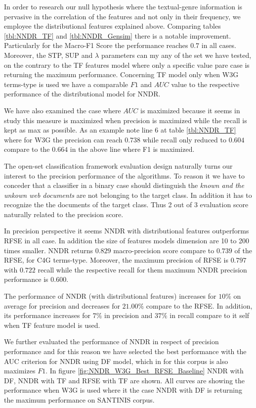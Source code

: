 \documentclass[runningheads]{llncs}
\begin{document}
In order to research our null hypothesis where the textual-genre information is pervasive in the correlation of the features and not only in their frequency, we employee the distributional features explained above. Comparing tables \ref{tbl:NNDR_TF} and \ref{tbl:NNDR_Gensim} there is a notable improvement. Particularly for the Macro-F1 Score the performance reaches $0.7$ in all cases. Moreover, the STP, SUP and $\lambda$ parameters can my any of the set we have tested, on the contrary to the TF features model where only a specific value pare case is returning the maximum performance. Concerning TF model only when W3G terms-type is used we have a comparable $F1$ and $AUC$ value to the respective performance of the distributional model for NNDR.

We have also examined the case where $AUC$ is maximized because it seems in \cite{pritsos2018open} study this measure is maximized when precision is maximized while the recall is kept as max as possible. As an example note line 6 at table \ref{tbl:NNDR_TF} where for W3G the precision can reach $0.738$ while recall only reduced to $0.604$ compare to the $0.664$ in the above line where F1 is maximized.

The open-set classification framework evaluation design naturally turns our interest to the precision performance of the algorithms. To reason it we have to conceder that a classifier in a binary case should distinguish the \textit{known and the unkown web documents} are not belonging to the target class. In addition it has to recognize the the documents of the target class. Thus 2 out of 3 evaluation score naturally related to the precision score.

In precision perspective it seems NNDR with distributional features outperforms RFSE in all case. In addition the size of features models dimension are 10 to 200 times smaller. NNDR returns $0.829$ macro-precision score compare to $0.739$ of the RFSE, for C4G terms-type. Moreover, the maximum precision of RFSE is $0.797$ with $0.722$ recall while the respective recall for them maximum NNDR precision performance is $0.600$.

The performance of NNDR (with distributional features) increases for $10\%$ on average for precision and decreases for $21.00\%$ compare to the RFSE. In addition, its performance increases for $7\%$ in precision and $37\%$ in recall compare to it self when TF feature model is used.

We further evaluated the performance of NNDR in respect of precision performance and for this reason we have selected the best performance with the AUC criterion for NNDR using DF model, which in for this corpus is also maximizes $F1$. In figure \ref{fig:NNDR_W3G_Best_RFSE_Baseline} NNDR with DF, NNDR with TF and RFSE with TF are shown. All curves are showing the performance when W3G is used where it the case NNDR with DF is returning the maximum performance on SANTINIS corpus.
\end{document}
